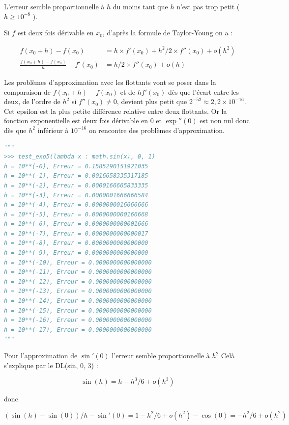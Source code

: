 \documentclass[
  11pt,
]{article}
\newcounter{exo}
\newcounter{prop}
\begin{document}
L'erreur semble proportionnelle à \(h\) du moins tant que \(h\) n'est
pas trop petit ( \(h \geqslant 10^{-8}\) ).

Si \(f\) est deux fois dérivable en \(x_0\), d'après la formule de
Taylor-Young on a :

\begin{align*}
f(x_0+h) - f(x_0) &= h \times f'(x_0) + h^2/2 \times f''(x_0) + o(h^2) \\
\frac{f(x_0+h) - f(x_0)}{h} - f'(x_{0}) &= h/2 \times f''(x_0) + o(h)
\end{align*}

Les problèmes d'approximation avec les flottants vont se poser dans la
comparaison de \(f(x_0+h) - f(x_0)\) et de \(hf'(x_0)\) dès que l'écart
entre les deux, de l'ordre de \(h^2\) si \(f''(x_0) \neq 0\), devient
plus petit que \(2^{-52} \approx 2,2 \times 10^{-16}\). Cet epsilon est
la plus petite différence relative entre deux flottants. Or la fonction
exponentielle est deux fois dérivable en 0 et \(\exp''(0)\) est non nul
donc dès que \(h^2\) inférieur à \(10^{-16}\) on rencontre des problèmes
d'approximation.

\begin{lstlisting}[language=Python]
"""
>>> test_exo5(lambda x : math.sin(x), 0, 1)
h = 10**(-0), Erreur = 0.1585290151921035
h = 10**(-1), Erreur = 0.0016658335317185
h = 10**(-2), Erreur = 0.0000166665833335
h = 10**(-3), Erreur = 0.0000001666666584
h = 10**(-4), Erreur = 0.0000000016666666
h = 10**(-5), Erreur = 0.0000000000166668
h = 10**(-6), Erreur = 0.0000000000001666
h = 10**(-7), Erreur = 0.0000000000000017
h = 10**(-8), Erreur = 0.0000000000000000
h = 10**(-9), Erreur = 0.0000000000000000
h = 10**(-10), Erreur = 0.0000000000000000
h = 10**(-11), Erreur = 0.0000000000000000
h = 10**(-12), Erreur = 0.0000000000000000
h = 10**(-13), Erreur = 0.0000000000000000
h = 10**(-14), Erreur = 0.0000000000000000
h = 10**(-15), Erreur = 0.0000000000000000
h = 10**(-16), Erreur = 0.0000000000000000
h = 10**(-17), Erreur = 0.0000000000000000
"""
\end{lstlisting}

Pour l'approximation de \(\sin'(0)\) l'erreur semble proportionnelle à
\(h^2\) Celà s'explique par le DL(sin, 0, 3) :

\[\sin(h) = h - h^3/6 + o(h^3)\]

donc

\[(\sin(h) - \sin(0))/h - \sin'(0) = 1 - h^2/6 + o(h^2) - \cos(0)=  -h^2/6 + o(h^2)\]
\end{document}
